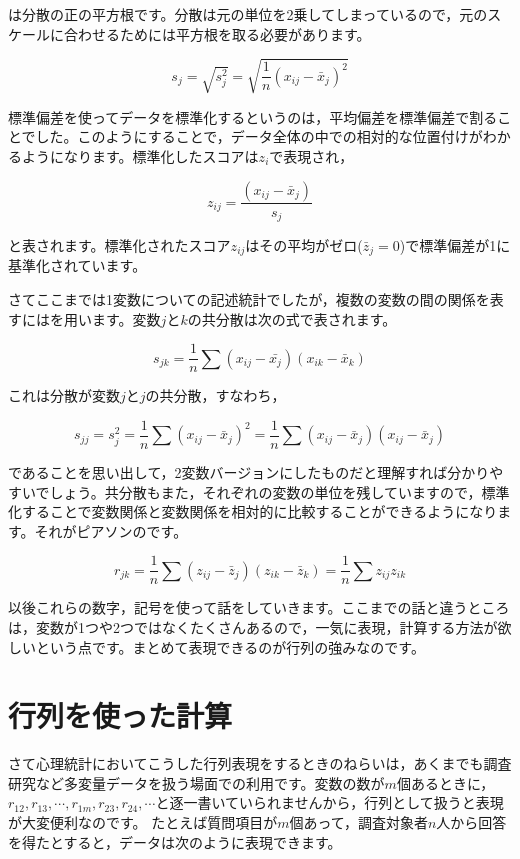 \documentclass{ltjsbook}
\begin{document}
は分散の正の平方根です。分散は元の単位を2乗してしまっているので，元のスケールに合わせるためには平方根を取る必要があります。

\[ s_j = \sqrt{s_j^2} = \sqrt{\frac{1}{n}(x_{ij}-\bar{x}_j)^2} \]

標準偏差を使ってデータを標準化するというのは，平均偏差を標準偏差で割ることでした。このようにすることで，データ全体の中での相対的な位置付けがわかるようになります。標準化したスコアは$z_i$で表現され，

\[ z_{ij} = \frac{(x_{ij} - \bar{x}_j)}{s_j}\]

と表されます。標準化されたスコア$z_{ij}$はその平均がゼロ($\bar{z}_j=0$)で標準偏差が1に基準化されています。

さてここまでは1変数についての記述統計でしたが，複数の変数の間の関係を表すにはを用います。変数$j$と$k$の共分散は次の式で表されます。

\[ s_{jk} = \frac{1}{n} \sum (x_{ij} - \bar{x_j})(x_{ik} - \bar{x}_k) \]

これは分散が変数$j$と$j$の共分散，すなわち，

\[s_{jj} = s_{j}^2 = \frac{1}{n}\sum (x_{ij} - \bar{x}_j)^2 = \frac{1}{n}\sum (x_{ij} - \bar{x}_j)(x_{ij} - \bar{x}_j) \]

であることを思い出して，2変数バージョンにしたものだと理解すれば分かりやすいでしょう。共分散もまた，それぞれの変数の単位を残していますので，標準化することで変数関係と変数関係を相対的に比較することができるようになります。それがピアソンのです。

\[ r_{jk} = \frac{1}{n}\sum (z_{ij}-\bar{z}_j)(z_{ik} - \bar{z}_k) = \frac{1}{n} \sum z_{ij}z_{ik} \]

以後これらの数字，記号を使って話をしていきます。ここまでの話と違うところは，変数が1つや2つではなくたくさんあるので，一気に表現，計算する方法が欲しいという点です。まとめて表現できるのが行列の強みなのです。
\section{行列を使った計算}
\label{MatrixAndDataCalcs}
さて心理統計においてこうした行列表現をするときのねらいは，あくまでも調査研究など多変量データを扱う場面での利用です。変数の数が$m$個あるときに，$r_{12},r_{13},\cdots,r_{1m},r_{23},r_{24},\cdots$と逐一書いていられませんから，行列として扱うと表現が大変便利なのです。
たとえば質問項目が$m$個あって，調査対象者$n$人から回答を得たとすると，データは次のように表現できます。
\end{document}
